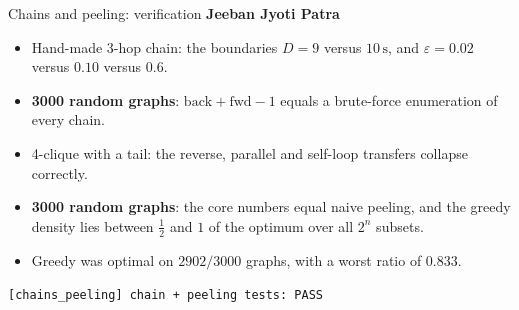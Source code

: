 \documentclass[aspectratio=169,11pt]{beamer}
\newcommand{\memberbadge}[1]{%
  \hfill{\small\bfseries\color{memberred}#1}%
}
\begin{document}
\begin{frame}{Chains and peeling: verification \memberbadge{Jeeban Jyoti Patra}}
\begin{itemize}
\setlength{\itemsep}{0.45em}
\item Hand-made 3-hop chain: the boundaries $D = 9$ versus $10\,\text{s}$, and $\varepsilon = 0.02$ versus $0.10$ versus $0.6$.
\item \textbf{3000 random graphs}: $\text{back} + \text{fwd} - 1$ equals a brute-force enumeration of every chain.
\item 4-clique with a tail: the reverse, parallel and self-loop transfers collapse correctly.
\item \textbf{3000 random graphs}: the core numbers equal naive peeling, and the greedy density lies between $\frac{1}{2}$ and $1$ of the optimum over all $2^n$ subsets.
\item Greedy was optimal on $2902/3000$ graphs, with a worst ratio of $0.833$.
\end{itemize}

\vspace{0.3cm}
\centering
\colorbox{softbg}{\texttt{[chains\_peeling] chain + peeling tests: PASS}}
\end{frame}
\end{document}
